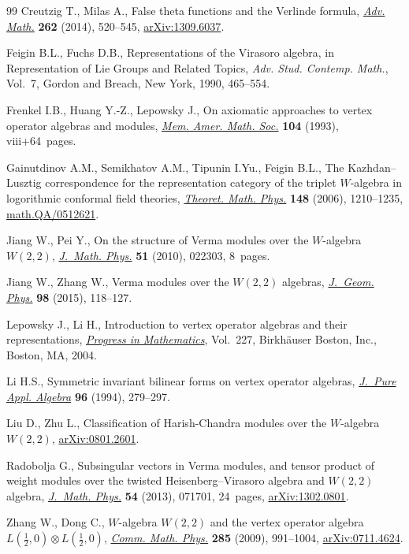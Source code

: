 \documentclass[pdftex]{sigma}
\numberwithin{equation}{section}
\begin{document}
\begin{thebibliography}{99}
Creutzig T., Milas A., False theta functions and the {V}erlinde formula,
 \href{http://dx.doi.org/10.1016/j.aim.2014.05.018}{\textit{Adv. Math.}} \textbf{262} (2014), 520--545, \href{http://arxiv.org/abs/1309.6037}{arXiv:1309.6037}.

Feigin B.L., Fuchs D.B., Representations of the {V}irasoro algebra, in
 Representation of {L}ie Groups and Related Topics, \textit{Adv. Stud.
 Contemp. Math.}, Vol.~7, Gordon and Breach, New York, 1990, 465--554.

Frenkel I.B., Huang Y.-Z., Lepowsky J., On axiomatic approaches to vertex
 operator algebras and modules, \href{http://dx.doi.org/10.1090/memo/0494}{\textit{Mem. Amer. Math. Soc.}} \textbf{104}
 (1993), viii+64~pages.

Gainutdinov A.M., Semikhatov A.M., Tipunin I.Yu., Feigin B.L., The
 {K}azhdan--{L}usztig correspondence for the representation category of the
 triplet {$W$}-algebra in logorithmic conformal f\/ield theories,
 \href{http://dx.doi.org/10.1007/s11232-006-0113-6}{\textit{Theoret. Math. Phys.}} \textbf{148} (2006), 1210--1235,
 \href{http://arxiv.org/abs/math.QA/0512621}{math.QA/0512621}.

Jiang W., Pei Y., On the structure of {V}erma modules over the {$W$}-algebra
 {$W(2,2)$}, \href{http://dx.doi.org/10.1063/1.3290646}{\textit{J.~Math. Phys.}} \textbf{51} (2010), 022303, 8~pages.

Jiang W., Zhang W., Verma modules over the {$W(2,2)$} algebras,
 \href{http://dx.doi.org/10.1016/j.geomphys.2015.07.029}{\textit{J.~Geom. Phys.}} \textbf{98} (2015), 118--127.

Lepowsky J., Li H., Introduction to vertex operator algebras and their
 representations, \href{http://dx.doi.org/10.1007/978-0-8176-8186-9}{\textit{Progress in Mathematics}}, Vol.~227, Birkh\"auser
 Boston, Inc., Boston, MA, 2004.

Li H.S., Symmetric invariant bilinear forms on vertex operator algebras,
 \href{http://dx.doi.org/10.1016/0022-4049(94)90104-X}{\textit{J.~Pure Appl. Algebra}} \textbf{96} (1994), 279--297.

Liu D., Zhu L., Classif\/ication of {H}arish-{C}handra modules over the
 {$W$}-algebra {$W(2,2)$}, \href{http://arxiv.org/abs/0801.2601}{arXiv:0801.2601}.

Radobolja G., Subsingular vectors in {V}erma modules, and tensor product of
 weight modules over the twisted {H}eisenberg--{V}irasoro algebra and
 {$W(2,2)$} algebra, \href{http://dx.doi.org/10.1063/1.4813439}{\textit{J.~Math. Phys.}} \textbf{54} (2013), 071701,
 24~pages, \href{http://arxiv.org/abs/1302.0801}{arXiv:1302.0801}.

Zhang W., Dong C., {$W$}-algebra {$W(2,2)$} and the vertex operator algebra
 {$L(\frac 12,0)\otimes L(\frac 12,0)$}, \href{http://dx.doi.org/10.1007/s00220-008-0562-x}{\textit{Comm. Math. Phys.}}
 \textbf{285} (2009), 991--1004, \href{http://arxiv.org/abs/0711.4624}{arXiv:0711.4624}.

\end{thebibliography}\LastPageEnding
\end{document}
